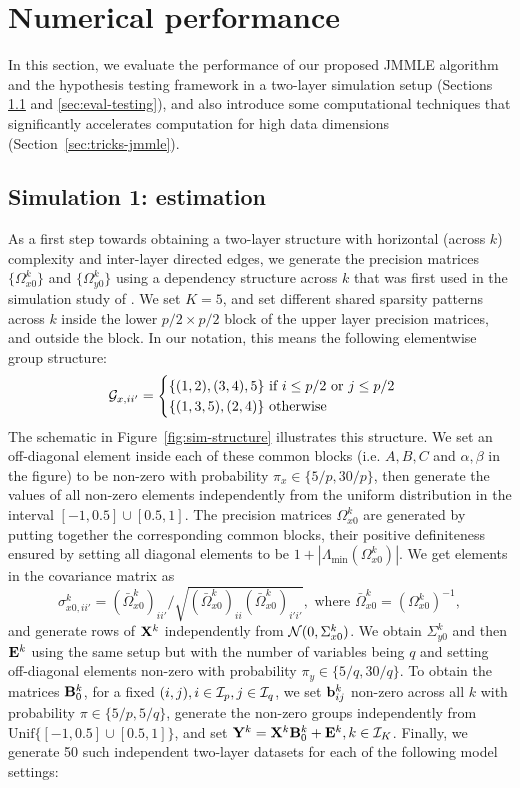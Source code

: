 \section{Numerical performance}
\label{sec:sec4}
In this section, we evaluate the performance of our proposed JMMLE algorithm and the hypothesis testing framework in a two-layer simulation setup (Sections \ref{sec:eval-jmmle} and \ref{sec:eval-testing}), and also introduce some computational techniques that significantly accelerates computation for high data dimensions (Section~\ref{sec:tricks-jmmle}).

\subsection{Simulation 1: estimation}
\label{sec:eval-jmmle}
As a first step towards obtaining a two-layer structure with horizontal (across $k$) complexity and inter-layer directed edges, we generate the precision matrices $\{ \Omega_{x0}^k \}$ and $\{ \Omega_{y0}^k \}$ using a dependency structure across $k$ that was first used in the simulation study of \cite{MaMichailidis15}. We set $K=5$, and set different shared sparsity patterns across $k$ inside the lower $p/2 \times p/2$ block of the upper layer precision matrices, and outside the block. In our notation, this means the following elementwise group structure:
%
$$
{\cal{G}}_{x,ii'} = \begin{cases}
\{ (1,2),(3,4), 5 \} \text{ if } i \leq p/2 \text{ or } j \leq p/2\\
\{ (1,3,5),(2,4) \} \text{ otherwise }
\end{cases}
$$
%
The schematic in Figure~\ref{fig:sim-structure} illustrates this structure. We set an off-diagonal element inside each of these common blocks (i.e. $A,B,C$ and $\alpha, \beta$ in the figure) to be non-zero with probability $\pi_x \in \{ 5/p, 30/p \}$, then generate the values of all non-zero elements independently from the uniform distribution in the interval $[-1, 0.5] \cup [0.5, 1]$. The precision matrices $\Omega_{x0}^k$ are generated by putting together the corresponding common blocks, their positive definiteness ensured by setting all diagonal elements to be $1 + |\Lambda_{\min} (\Omega_{x0}^k)|$. We get elements in the covariance matrix as
%
$$
\sigma_{x0,ii'}^k = (\bar \Omega_{x0}^k)_{ii'} / \sqrt{(\bar \Omega_{x0}^k)_{ii} (\bar \Omega_{x0}^k)_{i'i'} },
\text{ where } \bar \Omega_{x0}^k = (\Omega_{x0}^k)^{-1},
$$
and generate rows of ${\mathbf{X}}^k$ independently from ${\cal{N}}(0, \Sigma_{x0}^k)$. We obtain $\Sigma_{y0}^k$ and then ${\mathbf{E}}^k$ using the same setup but with the number of variables being $q$ and setting off-diagonal elements non-zero with probability $\pi_y \in \{ 5/q, 30/q \}$. To obtain the matrices ${\mathbf{B}}_0^k$, for a fixed $(i,j), i \in {\cal{I}}_p, j \in {\cal{I}}_q$, we set ${\bf{b}}_{ij}^k$ non-zero across all $k$ with probability $\pi \in \{ 5/p, 5/q \}$, generate the non-zero groups independently from $\text{Unif} \{ [-1, 0.5] \cup [0.5, 1] \}$, and set ${\mathbf{Y}}^k = {\mathbf{X}}^k {\mathbf{B}}_0^k + {\mathbf{E}}^k, k \in {\cal{I}}_K$. Finally, we generate 50 such independent two-layer datasets for each of the following model settings:

